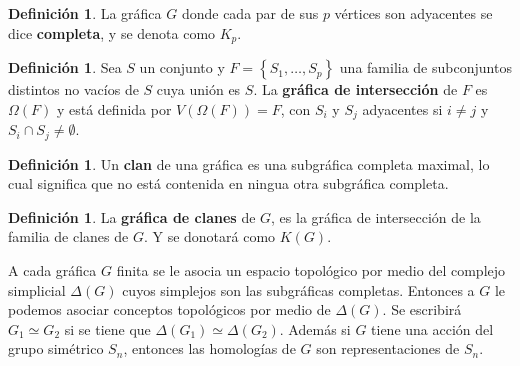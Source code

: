\documentclass[12pt]{book}
\theoremstyle{definition}
\newtheorem{definition}[theorem]{Definición}
\newcounter{in}
\newcounter{ini}
\begin{document}
\begin{definition}
  \label{complete_graph}
  La gráfica $G$ donde cada par de sus $p$ vértices son adyacentes se
  dice \textbf{completa}, y se denota como $K_{p}$.
\end{definition}


\begin{definition}
  \label{intersection_graph}
  Sea $S$ un conjunto y $F = \left\{ S_{1}, \ldots, S_{p} \right\}$
  una familia de subconjuntos distintos no vacíos de $S$ cuya unión es
  $S$. La \textbf{gráfica de intersección} de $F$ es $\Omega(F)$ y
  está definida por $V(\Omega(F)) = F$, con $S_{i}$ y $S_{j}$
  adyacentes si $i \neq j$ y $S_{i} \cap S_{j} \neq \emptyset$.
\end{definition}

\begin{definition}
  \label{clique}
  Un \textbf{clan} de una gráfica es una subgráfica completa maximal,
  lo cual significa que no está contenida en ningua otra subgráfica
  completa.
\end{definition}


\begin{definition}
  \label{clique_graph}
  La \textbf{gráfica de clanes} de $G$, es la gráfica de intersección
  de la familia de clanes de $G$. Y se donotará como $K(G)$.
\end{definition}

A cada gráfica $G$ finita se le asocia un espacio topológico por medio
del complejo simplicial $\Delta(G)$ cuyos simplejos son las
subgráficas completas. Entonces a $G$ le podemos asociar conceptos
topológicos por medio de $\Delta(G)$. Se escribirá
$G_{1} \simeq G_{2}$ si se tiene que
$\Delta(G_{1}) \simeq \Delta(G_{2})$.  Además si $G$ tiene una acción
del grupo simétrico $S_{n}$, entonces las homologías de $G$ son
representaciones de $S_{n}$.


\backmatter




\printindex
\end{document}
